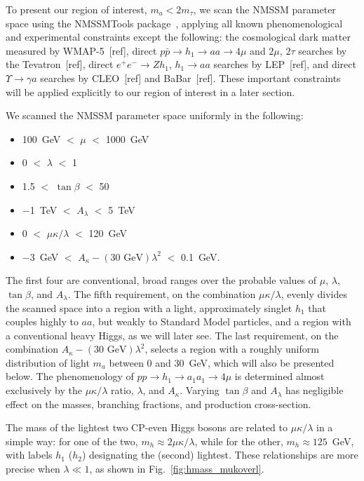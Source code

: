 \documentclass[aps,12pt,superscriptaddress,nofootinbib,floatfix,showpacs]{revtex4}
\begin{document}
To present our region of interest, $m_a < 2m_\tau$, we scan the NMSSM
parameter space using the NMSSMTools
package~\cite{nmssmtools1,nmssmtools2,nmssmtools3}, applying all known
phenomenological and experimental constraints except the following:
the cosmological dark matter measured by WMAP-5~[ref], direct
$p\bar{p} \to h_1 \to aa \to 4\mu$ and $2\mu$, $2\tau$ searches by the
Tevatron~[ref], direct $e^+e^- \to Zh_1$, $h_1 \to aa$ searches by
LEP~[ref], and direct $\Upsilon \to \gamma a$ searches by CLEO~[ref]
and BaBar~[ref].  These important constraints will be applied
explicitly to our region of interest in a later section.

We scanned the NMSSM parameter space uniformly in the following:
\begin{itemize}
\item 100~GeV $<$ $\mu$ $<$ 1000~GeV
\item 0 $<$ $\lambda$ $<$ 1
\item 1.5 $<$ $\tan\beta$ $<$ 50
\item $-$1~TeV $<$ $A_\lambda$ $<$ 5~TeV
\item 0 $<$ $\mu\kappa/\lambda$ $<$ 120~GeV
\item $-$3~GeV $<$ $A_\kappa - (\mbox{30~GeV})\lambda^2$ $<$ 0.1~GeV.
\end{itemize}
The first four are conventional, broad ranges over the probable values
of $\mu$, $\lambda$, $\tan\beta$, and $A_\lambda$.  The fifth
requirement, on the combination $\mu\kappa/\lambda$, evenly divides
the scanned space into a region with a light, approximately singlet
$h_1$ that couples highly to $aa$, but weakly to Standard Model
particles, and a region with a conventional heavy Higgs, as we will
later see.  The last requirement, on the combination $A_\kappa -
(\mbox{30~GeV})\lambda^2$, selects a region with a roughly uniform
distribution of light $m_a$ between 0 and 30~GeV, which will also be
presented below.  The phenomenology of $pp \to h_1 \to
a_1a_1 \to 4\mu$ is determined almost exclusively by the
$\mu\kappa/\lambda$ ratio, $\lambda$, and $A_\kappa$.  Varying
$\tan\beta$ and $A_\lambda$ has negligible effect on the masses,
branching fractions, and production cross-section.

The mass of the lightest two CP-even Higgs bosons are related to
$\mu\kappa/\lambda$ in a simple way: for one of the two, $m_h \approx
2 \mu\kappa/\lambda$, while for the other, $m_h \approx 125$~GeV, with
labels $h_1$ ($h_2$) designating the (second) lightest.  These
relationships are more precise when $\lambda \ll 1$, as shown in
Fig.~\ref{fig:hmass_mukoverl}.
\end{document}
